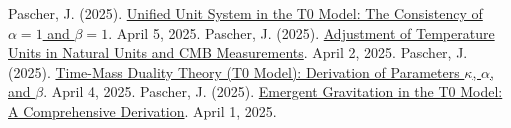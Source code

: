 \documentclass[a4paper,12pt]{article}
\begin{document}
\begin{thebibliography}{99}
		 Pascher, J. (2025). \href{https://github.com/jpascher/T0-Time-Mass-Duality/tree/main/2/pdf/English/Alpha1Beta1KonsistenzEn.pdf}{Unified Unit System in the T0 Model: The Consistency of \(\alpha = 1\) and \(\beta = 1\)}. April 5, 2025.
		 Pascher, J. (2025). \href{https://github.com/jpascher/T0-Time-Mass-Duality/tree/main/2/pdf/English/TempEinheitenCMBEn.pdf}{Adjustment of Temperature Units in Natural Units and CMB Measurements}. April 2, 2025.
		 Pascher, J. (2025). \href{https://github.com/jpascher/T0-Time-Mass-Duality/tree/main/2/pdf/English/ZeitMasseT0ParamsEn.pdf}{Time-Mass Duality Theory (T0 Model): Derivation of Parameters \(\kappa\), \(\alpha\), and \(\beta\)}. April 4, 2025.
		 Pascher, J. (2025). \href{https://github.com/jpascher/T0-Time-Mass-Duality/tree/main/2/pdf/English/EmergentGravT0En.pdf}{Emergent Gravitation in the T0 Model: A Comprehensive Derivation}. April 1, 2025.
	\end{thebibliography}
	
\end{document}
